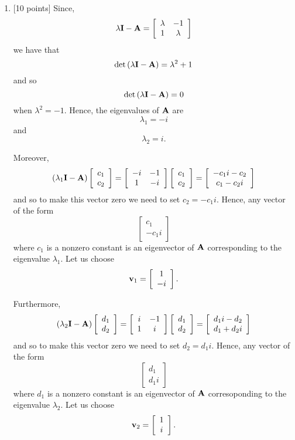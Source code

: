 \begin{solution}
\begin{enumerate}
\item {[10 points]} Since,
\[
\lambda{\bf I}-{\bf A}=\left[\begin{array}{cc}\lambda & -1\\1 & \lambda\end{array}\right]
\]
we have that
\[
\det\left(\lambda{\bf I}-{\bf A}\right)=\lambda^2+1
\]
and so
\[
\det\left(\lambda{\bf I}-{\bf A}\right)=0
\]
when $\lambda^2=-1$. Hence, the eigenvalues of ${\bf A}$ are
\[
\lambda_1=-i
\]
and
\[
\lambda_2=i.
\]

Moreover,
\[
\left(\lambda_1{\bf I}-{\bf A}\right)\left[\begin{array}{c}c_1 \\ c_2\end{array}\right]=\left[\begin{array}{cc}-i & -1\\1 & -i\end{array}\right]\left[\begin{array}{c}c_1 \\ c_2\end{array}\right]=\left[\begin{array}{c}-c_1i-c_2 \\ c_1-c_2i\end{array}\right]
\]
and so to make this vector zero we need to set $c_2=-c_1i$. Hence, any vector of the form
\[
\left[\begin{array}{c}c_1 \\ -c_1i\end{array}\right]
\]
where $c_1$ is a nonzero constant is an eigenvector of ${\bf A}$ corresponding to the eigenvalue $\lambda_1$. Let us choose
\[
{\bf v}_1=\left[\begin{array}{c}1 \\ -i\end{array}\right].
\]

Furthermore,
\[
\left(\lambda_2{\bf I}-{\bf A}\right)\left[\begin{array}{c}d_1 \\ d_2\end{array}\right]=\left[\begin{array}{cc}i & -1\\1 & i\end{array}\right]\left[\begin{array}{c}d_1 \\ d_2\end{array}\right]=\left[\begin{array}{c}d_1i-d_2 \\ d_1+d_2i\end{array}\right]
\]
and so to make this vector zero we need to set $d_2=d_1i$. Hence, any vector of the form
\[
\left[\begin{array}{c}d_1 \\ d_1i\end{array}\right]
\]
where $d_1$ is a nonzero constant is an eigenvector of ${\bf A}$ corresoponding to the eigenvalue $\lambda_2$. Let us choose
\[
{\bf v}_2=\left[\begin{array}{c}1 \\ i\end{array}\right].
\]


\end{enumerate}
\end{solution}

